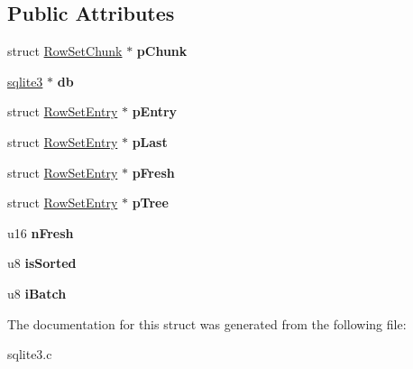 \subsection*{Public Attributes}
\begin{DoxyCompactItemize}
\item 
\hypertarget{struct_row_set_af064f9ec7b1ba820a3d53622bde9d42f}{struct \hyperlink{struct_row_set_chunk}{Row\-Set\-Chunk} $\ast$ {\bfseries p\-Chunk}}\label{struct_row_set_af064f9ec7b1ba820a3d53622bde9d42f}

\item 
\hypertarget{struct_row_set_a7da847a06c2f90025fbd89c57516c6f6}{\hyperlink{structsqlite3}{sqlite3} $\ast$ {\bfseries db}}\label{struct_row_set_a7da847a06c2f90025fbd89c57516c6f6}

\item 
\hypertarget{struct_row_set_a3eccaf69ad7863abae2541a7c0b94e1d}{struct \hyperlink{struct_row_set_entry}{Row\-Set\-Entry} $\ast$ {\bfseries p\-Entry}}\label{struct_row_set_a3eccaf69ad7863abae2541a7c0b94e1d}

\item 
\hypertarget{struct_row_set_a040c4b798e6f20d20aa99a45e93b2079}{struct \hyperlink{struct_row_set_entry}{Row\-Set\-Entry} $\ast$ {\bfseries p\-Last}}\label{struct_row_set_a040c4b798e6f20d20aa99a45e93b2079}

\item 
\hypertarget{struct_row_set_a7c4e95bd08ff77135068bb3987be5ca1}{struct \hyperlink{struct_row_set_entry}{Row\-Set\-Entry} $\ast$ {\bfseries p\-Fresh}}\label{struct_row_set_a7c4e95bd08ff77135068bb3987be5ca1}

\item 
\hypertarget{struct_row_set_a10dee0e9d9998a3726bcd4f20754991b}{struct \hyperlink{struct_row_set_entry}{Row\-Set\-Entry} $\ast$ {\bfseries p\-Tree}}\label{struct_row_set_a10dee0e9d9998a3726bcd4f20754991b}

\item 
\hypertarget{struct_row_set_a0ed2a47d6789a70081f3454ef2604e7f}{u16 {\bfseries n\-Fresh}}\label{struct_row_set_a0ed2a47d6789a70081f3454ef2604e7f}

\item 
\hypertarget{struct_row_set_a59ef5b2dc2d3d8317307254743f92545}{u8 {\bfseries is\-Sorted}}\label{struct_row_set_a59ef5b2dc2d3d8317307254743f92545}

\item 
\hypertarget{struct_row_set_af33d206290792936cb1ebbb8e03baf64}{u8 {\bfseries i\-Batch}}\label{struct_row_set_af33d206290792936cb1ebbb8e03baf64}

\end{DoxyCompactItemize}


The documentation for this struct was generated from the following file\-:\begin{DoxyCompactItemize}
\item 
sqlite3.\-c\end{DoxyCompactItemize}
